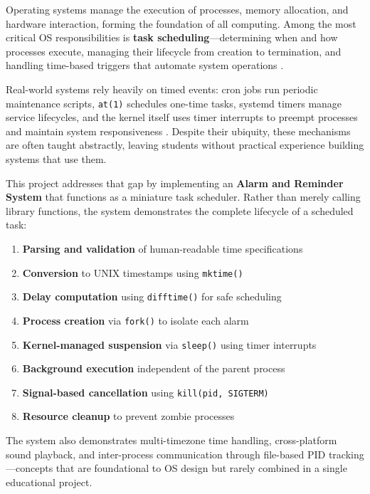 \documentclass[conference]{IEEEtran}
\begin{document}
Operating systems manage the execution of processes, memory allocation, and hardware interaction, forming the foundation of all computing. Among the most critical OS responsibilities is \textbf{task scheduling}---determining when and how processes execute, managing their lifecycle from creation to termination, and handling time-based triggers that automate system operations \cite{silberschatz2018}.

Real-world systems rely heavily on timed events: cron jobs run periodic maintenance scripts, \texttt{at(1)} schedules one-time tasks, systemd timers manage service lifecycles, and the kernel itself uses timer interrupts to preempt processes and maintain system responsiveness \cite{tanenbaum2015}. Despite their ubiquity, these mechanisms are often taught abstractly, leaving students without practical experience building systems that use them.

This project addresses that gap by implementing an \textbf{Alarm and Reminder System} that functions as a miniature task scheduler. Rather than merely calling library functions, the system demonstrates the complete lifecycle of a scheduled task:

\begin{enumerate}
    \item \textbf{Parsing and validation} of human-readable time specifications
    \item \textbf{Conversion} to UNIX timestamps using \texttt{mktime()}
    \item \textbf{Delay computation} using \texttt{difftime()} for safe scheduling
    \item \textbf{Process creation} via \texttt{fork()} to isolate each alarm
    \item \textbf{Kernel-managed suspension} via \texttt{sleep()} using timer interrupts
    \item \textbf{Background execution} independent of the parent process
    \item \textbf{Signal-based cancellation} using \texttt{kill(pid, SIGTERM)}
    \item \textbf{Resource cleanup} to prevent zombie processes
\end{enumerate}

The system also demonstrates multi-timezone time handling, cross-platform sound playback, and inter-process communication through file-based PID tracking---concepts that are foundational to OS design but rarely combined in a single educational project.
\end{document}
